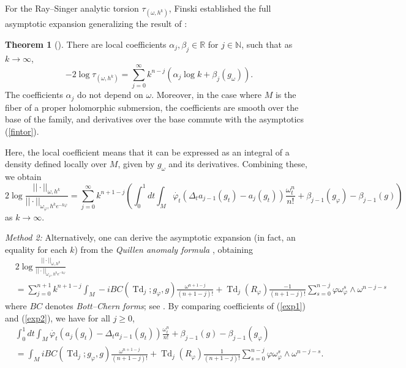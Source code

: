 \documentclass[12pt,reqno,a4paper]{amsart}
\numberwithin{equation}{section}
\DeclareMathOperator{\Td}{Td}
\theoremstyle{definition}
\newtheorem{theorem}{Theorem}
\theoremstyle{remark}
\begin{document}
For the Ray--Singer analytic torsion $\tau_{(\omega,h^k)}$, Finski established the full asymptotic expansion generalizing the result of \cite{vasserot1989asymptotics}:
\begin{theorem}[]\label{Finski}
There are local coefficients $\alpha_j, \beta_j\in\mathbb{R}$ for $j\in\mathbb{N}$, such that as $k\rightarrow\infty$,
\begin{equation}\label{fintor}
-2\log \tau_{(\omega,h^k)}=\sum_{j=0}^{\infty}k^{n-j}(\alpha_j\log k + \beta_j(g_\omega)).
\end{equation}
The coefficients $\alpha_j$ do not depend on $\omega$. Moreover, in the case where $M$ is the fiber of a proper holomorphic submersion, 
the coefficients are smooth over the base of the family, and derivatives 
over the base commute with the asymptotics (\ref{fintor}).
\end{theorem}
Here, the local coefficient means that it can be expressed as an integral of a density defined locally over $M$, given by $g_\omega$ and its derivatives. Combining these, we obtain
\begin{equation}\label{exp1}
2\log \frac{||\cdot||_{\omega,h^k}}{||\cdot||_{\omega_\varphi,h^ke^{-k\varphi}}}=\sum_{j=0}^\infty k^{n+1-j}\left(\int_0^1 dt\int_M \dot{\varphi_t}(\Delta_t a_{j-1}(g_{t})-a_{j}(g_t))\frac{\omega_t^n}{n!}+\beta_{j-1}(g_\varphi)-\beta_{j-1}(g)\right)
\end{equation}
as $k\rightarrow\infty$.

\textit{Method 2:} Alternatively, one can derive the asymptotic expansion (in fact, an equality for each $k$) from the \textit{Quillen anomaly formula} \cite[Theorem 1.23]{bismut1988analytic3}, obtaining
\begin{align}\label{exp2}
&2\log \frac{||\cdot||_{\omega,h^k}}{||\cdot||_{\omega_\varphi,h^ke^{-k\varphi}}}\nonumber\\
&=\sum_{j=0}^{n+1} k^{n+1-j}\int_M -iBC(\Td_j;g_{\varphi},g)\frac{\omega^{n+1-j}}{(n+1-j)!}+\Td_{j}(R_\varphi)\frac{-1}{(n+1-j)!}\sum^{n-j}_{s=0}\varphi \omega_{\varphi}^s\wedge \omega^{n-j-s}
\end{align}
where $BC$ denotes \textit{Bott--Chern forms}; see \cite{BC,bismut1988analytic1}.
By comparing coefficients of (\ref{exp1}) and (\ref{exp2}), we have for all $j\geq0$,
\begin{align}\label{exp3}
&\int_0^1 dt\int_M \dot{\varphi_t}(a_{j}(g_t)-\Delta_t a_{j-1}(g_t))\frac{\omega_t^n}{n!}+\beta_{j-1}(g)-\beta_{j-1}(g_\varphi)\nonumber\\
&=\int_M iBC(\Td_j;g_{\varphi},g)\frac{\omega^{n+1-j}}{(n+1-j)!}+\Td_{j}(R_\varphi)\frac{1}{(n+1-j)!}\sum^{n-j}_{s=0}\varphi \omega_{\varphi}^s\wedge \omega^{n-j-s}.
\end{align}
\end{document}

